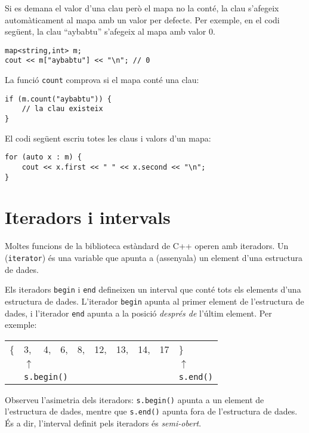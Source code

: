 Si es demana el valor d'una clau
però el mapa no la conté,
la clau s'afegeix automàticament al mapa amb
un valor per defecte.
Per exemple, en el codi següent,
la clau ``aybabtu'' s'afegeix al mapa
amb valor 0.

\begin{lstlisting}
map<string,int> m;
cout << m["aybabtu"] << "\n"; // 0
\end{lstlisting}
La funció \texttt{count} comprova
si el mapa conté una clau:
\begin{lstlisting}
if (m.count("aybabtu")) {
    // la clau existeix
}
\end{lstlisting}
El codi següent escriu totes les claus i valors
d'un mapa:
\begin{lstlisting}
for (auto x : m) {
    cout << x.first << " " << x.second << "\n";
}
\end{lstlisting}

\section{Iteradors i intervals}


Moltes funcions de la biblioteca estàndard de C++
operen amb iteradors.
Un  (\texttt{iterator}) és una variable que
apunta a (assenyala) un element d'una estructura de dades.

Els iteradors \texttt{begin}
i \texttt{end} defineixen un interval que conté
tots els elements d'una estructura de dades.
L'iterador \texttt{begin} apunta
al primer element de l'estructura de dades,
i l'iterador \texttt{end} apunta
a la posició \emph{després de} l'últim element.
Per exemple:

\begin{center}
\begin{tabular}{llllllllll}
\{ & 3, & 4, & 6, & 8, & 12, & 13, & 14, & 17 & \} \\
& $\uparrow$ & & & & & & & & $\uparrow$ \\
& \multicolumn{3}{l}{\texttt{s.begin()}} & & & & & & \texttt{s.end()} \\
\end{tabular}
\end{center}

Observeu l'asimetria dels iteradors:
\texttt{s.begin()} apunta a un element de l'estructura de dades,
mentre que \texttt{s.end()} apunta fora de l'estructura de dades.
És a dir, l'interval definit pels iteradors és \emph{semi-obert}.


